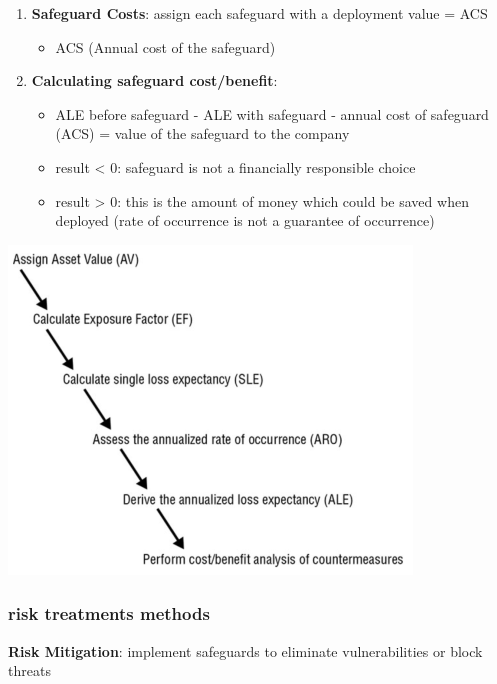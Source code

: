 \documentclass[11pt,twoside,landscape]{article}
\begin{document}
\begin{multicols}{4}
\begin{enumerate}
\item \textbf{Safeguard Costs}: assign each safeguard with a deployment value = ACS
\begin{itemize}
\item ACS (Annual cost of the safeguard)
\end{itemize}

\item \textbf{Calculating safeguard cost/benefit}:
\begin{itemize}
\item ALE before safeguard - ALE with safeguard - annual cost of safeguard (ACS) = value of the safeguard to the company
\item result < 0: safeguard is not a financially responsible choice
\item result > 0: this is the amount of money which could be saved when deployed (rate of occurrence is not a guarantee of occurrence)
\end{itemize}
\end{enumerate}

\begin{center}
\includegraphics[width=.9\linewidth]{static/img/cysec/quantitative_risk_analysis.png}
\end{center}

\subsubsection*{risk treatments methods}
\label{sec:orgce3da03}
\textbf{Risk Mitigation}: implement safeguards to eliminate vulnerabilities or block threats


\end{multicols}
\end{document}
